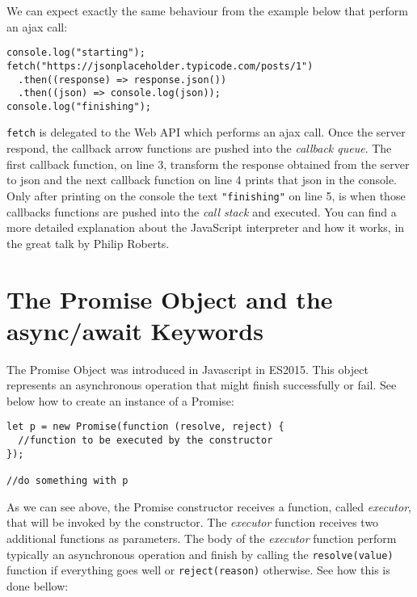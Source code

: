 \documentclass[a4paper, oneside, titlepage, 12pt]{book}
\begin{document}
We can expect exactly the same behaviour from the example below that perform an ajax call:

\begin{verbatim}
console.log("starting");
fetch("https://jsonplaceholder.typicode.com/posts/1")
  .then((response) => response.json())
  .then((json) => console.log(json));
console.log("finishing");
\end{verbatim}

\texttt{fetch} is delegated to the Web API which performs an ajax call. Once the server respond, the callback arrow functions are pushed into the \textit{callback queue}. The first callback function, on line 3, transform the response obtained from the server to json and the next callback function on line 4 prints that json in the console. Only after printing on the console the text \texttt{"finishing"} on line 5, is when those callbacks functions are pushed into the \textit{call stack} and executed. You can find a more detailed explanation about the JavaScript interpreter and how it works, in the great talk by Philip Roberts\cite{loupe}.

\section{The Promise Object and the async/await Keywords}

The Promise Object was introduced in Javascript in ES2015. This object represents an asynchronous operation that might finish successfully or fail. See below how to create an instance of a Promise:

\begin{verbatim}
let p = new Promise(function (resolve, reject) {
  //function to be executed by the constructor
});

//do something with p
\end{verbatim}

As we can see above, the Promise constructor receives a function, called \textit{executor}, that will be invoked by the constructor. The \textit{executor} function receives two additional functions as parameters. The body of the \textit{executor} function perform typically an asynchronous operation and finish by calling the \texttt{resolve(value)} function if everything goes well or \texttt{reject(reason)} otherwise. See how this is done bellow:
\end{document}
